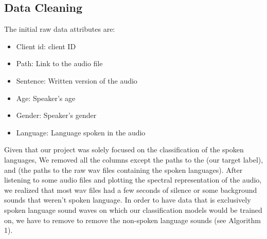 \documentclass[11pt]{article}
\begin{document}
\subsection{Data Cleaning}
The initial raw data attributes are:\\
\begin{itemize}
    \item Client id: client ID
    \item Path: Link to the audio file
    \item Sentence: Written version of the audio
    \item Age: Speaker's age
    \item Gender: Speaker's gender
    \item Language: Language spoken in the audio
\end{itemize}
Given that our project was solely focused on the classification of the spoken languages, We removed all the columns except the paths to the  (our target label), and  (the paths to the raw wav files containing the spoken languages). After listening to some audio files and plotting the spectral representation of the audio, we realized that most wav files had a few seconds of silence or some background sounds that weren't spoken language. In order to have data that is exclusively spoken language sound waves on which our classification models would be trained on, we have to remove to remove the non-spoken language sounds (see Algorithm 1).  
\end{document}
